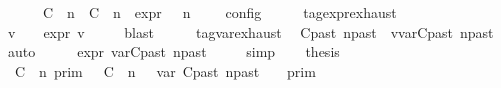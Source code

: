 \begin{isabellebody}
\ \ \ \ {\isasymunion}\ {\isasymlbrakk}\ {\isacharparenleft}{\isacharparenleft}C\ {\isasymUp}\ n{\isacharparenright}\ {\isacharhash}\ {\isacharparenleft}C\ {\isasymDown}\ n\ {\isacharat}{\isasymsharp}\ {\isasymtau}\isactrlsub e\isactrlsub x\isactrlsub p\isactrlsub r{\isacharparenright}\ {\isacharhash}\ {\isasymGamma}{\isacharparenright}{\isacharcomma}\ n\ {\isasymTurnstile}\ {\isasymPsi}\ {\isasymtriangleright}\ {\isasymPhi}\ {\isasymrbrakk}\isactrlsub c\isactrlsub o\isactrlsub n\isactrlsub f\isactrlsub i\isactrlsub g{\isacartoucheclose}\isanewline
%
\isadelimproof
%
\endisadelimproof
%
\isatagproof
{}\isamarkupfalse%
\ {\isacharminus}\isanewline
\ \ \isamarkupfalse%
\ tag{\isacharunderscore}expr{\isachardot}exhaust\ \isamarkupfalse%
\ v\ {\isasymdelta}{\isasymtau}\ \ {\isacartoucheopen}\ {\isasymtau}\isactrlsub e\isactrlsub x\isactrlsub p\isactrlsub r{\isacharequal}{\isasymlparr}\ v\ {\isasymoplus}\ {\isasymdelta}{\isasymtau}\ {\isasymrparr}{\isacartoucheclose}\ \isamarkupfalse%
\ blast\isanewline
\ \ \isamarkupfalse%
\ \isamarkupfalse%
\ tag{\isacharunderscore}var{\isachardot}exhaust\ \isamarkupfalse%
\ C\isactrlsub p\isactrlsub a\isactrlsub s\isactrlsub t\ n\isactrlsub p\isactrlsub a\isactrlsub s\isactrlsub t\ \ {\isacartoucheopen}v{\isacharequal}{\isasymtau}\isactrlsub v\isactrlsub a\isactrlsub r{\isacharparenleft}C\isactrlsub p\isactrlsub a\isactrlsub s\isactrlsub t{\isacharcomma}\ n\isactrlsub p\isactrlsub a\isactrlsub s\isactrlsub t{\isacharparenright}{\isacartoucheclose}\ \isamarkupfalse%
\ auto\isanewline
\ \ \isamarkupfalse%
\ \isamarkupfalse%
\ {\isacharasterisk}{\isacharcolon}{\isacartoucheopen}{\isasymtau}\isactrlsub e\isactrlsub x\isactrlsub p\isactrlsub r{\isacharequal}{\isasymlparr}\ {\isasymtau}\isactrlsub v\isactrlsub a\isactrlsub r{\isacharparenleft}C\isactrlsub p\isactrlsub a\isactrlsub s\isactrlsub t{\isacharcomma}\ n\isactrlsub p\isactrlsub a\isactrlsub s\isactrlsub t{\isacharparenright}\ {\isasymoplus}\ {\isasymdelta}{\isasymtau}\ {\isasymrparr}{\isacartoucheclose}\ \isamarkupfalse%
\ simp\isanewline
\ \ \isamarkupfalse%
\ {\isacharquery}thesis\isanewline
\ \ \isamarkupfalse%
\ {\isacharminus}\isanewline
\ \ \ \ \isamarkupfalse%
\ {\isacartoucheopen}{\isacharparenleft}{\isasymlbrakk}\ C\ {\isasymUp}\ n\ {\isasymrbrakk}\isactrlsub p\isactrlsub r\isactrlsub i\isactrlsub m\ {\isasyminter}\ {\isasymlbrakk}\ C\ {\isasymDown}\ n\ {\isacharat}{\isasymsharp}\ {\isasymlparr}\ {\isasymtau}\isactrlsub v\isactrlsub a\isactrlsub r\ {\isacharparenleft}C\isactrlsub p\isactrlsub a\isactrlsub s\isactrlsub t{\isacharcomma}\ n\isactrlsub p\isactrlsub a\isactrlsub s\isactrlsub t{\isacharparenright}\ {\isasymoplus}\ {\isasymdelta}{\isasymtau}\ {\isasymrparr}\ {\isasymrbrakk}\isactrlsub p\isactrlsub r\isactrlsub i\isactrlsub m\isanewline

\end{isabellebody}
